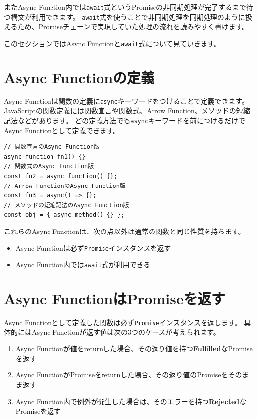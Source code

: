またAsync
Function内では\texttt{await}式というPromiseの非同期処理が完了するまで待つ構文が利用できます。
\texttt{await}式を使うことで非同期処理を同期処理のように扱えるため、Promiseチェーンで実現していた処理の流れを読みやすく書けます。

このセクションではAsync
Functionと\texttt{await}式について見ていきます。

\hypertarget{declare-async-function}{%
\section{Async Functionの定義}\label{declare-async-function}}

Async
Functionは関数の定義に\texttt{async}キーワードをつけることで定義できます。
JavaScriptの関数定義には関数宣言や関数式、Arrow
Function、メソッドの短縮記法などがあります。
どの定義方法でも\texttt{async}キーワードを前につけるだけでAsync
Functionとして定義できます。

\begin{lstlisting}
// 関数宣言のAsync Function版
async function fn1() {}
// 関数式のAsync Function版
const fn2 = async function() {};
// Arrow FunctionのAsync Function版
const fn3 = async() => {};
// メソッドの短縮記法のAsync Function版
const obj = { async method() {} };
\end{lstlisting}

これらのAsync Functionは、次の点以外は通常の関数と同じ性質を持ちます。

\begin{itemize}
\item
  Async
  Functionは必ず\texttt{Promise}インスタンスを返す
\item
  Async Function内では\texttt{await}式が利用できる
\end{itemize}

\hypertarget{async-function-return-promise}{%
\section{Async
FunctionはPromiseを返す}\label{async-function-return-promise}}

Async
Functionとして定義した関数は必ず\texttt{Promise}インスタンスを返します。
具体的にはAsync Functionが返す値は次の3つのケースが考えられます。

\begin{enumerate}
\def\labelenumi{\arabic{enumi}.}
\item
  Async
  Functionが値をreturnした場合、その返り値を持つ\textbf{Fulfilled}なPromiseを返す
\item
  Async
  FunctionがPromiseをreturnした場合、その返り値のPromiseをそのまま返す
\item
  Async
  Function内で例外が発生した場合は、そのエラーを持つ\textbf{Rejected}なPromiseを返す
\end{enumerate}

